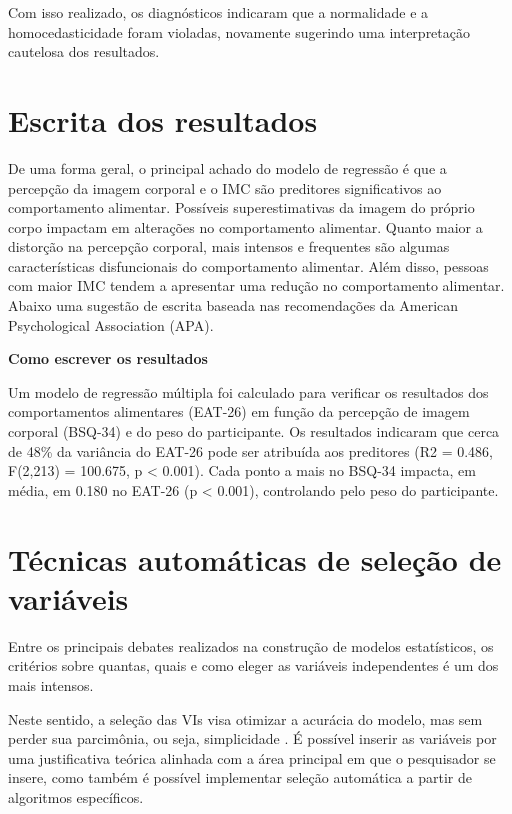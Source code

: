 \documentclass[
]{book}
\newenvironment{writing}{
  \definecolor{shadecolor}{rgb}{0, 0, 0}  %
  \color{white}
  \begin{shaded}}
 {\end{shaded}}
\begin{document}
Com isso realizado, os diagnósticos indicaram que a normalidade e a homocedasticidade foram violadas, novamente sugerindo uma interpretação cautelosa dos resultados.

\hypertarget{escrita-dos-resultados-5}{%
\section{Escrita dos resultados}\label{escrita-dos-resultados-5}}

De uma forma geral, o principal achado do modelo de regressão é que a percepção da imagem corporal e o IMC são preditores significativos ao comportamento alimentar. Possíveis superestimativas da imagem do próprio corpo impactam em alterações no comportamento alimentar. Quanto maior a distorção na percepção corporal, mais intensos e frequentes são algumas características disfuncionais do comportamento alimentar. Além disso, pessoas com maior IMC tendem a apresentar uma redução no comportamento alimentar. Abaixo uma sugestão de escrita baseada nas recomendações da American Psychological Association (APA).

\begin{writing}

\textbf{Como escrever os resultados}

Um modelo de regressão múltipla foi calculado para verificar os resultados dos comportamentos alimentares (EAT-26) em função da percepção de imagem corporal (BSQ-34) e do peso do participante. Os resultados indicaram que cerca de 48\% da variância do EAT-26 pode ser atribuída aos preditores (R2 = 0.486, F(2,213) = 100.675, p \textless{} 0.001). Cada ponto a mais no BSQ-34 impacta, em média, em 0.180 no EAT-26 (p \textless{} 0.001), controlando pelo peso do participante.

\end{writing}

\hypertarget{tuxe9cnicas-automuxe1ticas-de-seleuxe7uxe3o-de-variuxe1veis}{%
\section{Técnicas automáticas de seleção de variáveis}\label{tuxe9cnicas-automuxe1ticas-de-seleuxe7uxe3o-de-variuxe1veis}}

Entre os principais debates realizados na construção de modelos estatísticos, os critérios sobre quantas, quais e como eleger as variáveis independentes é um dos mais intensos.

Neste sentido, a seleção das VIs visa otimizar a acurácia do modelo, mas sem perder sua parcimônia, ou seja, simplicidade \citep{Unger1973, Gaudio2001}. É possível inserir as variáveis por uma justificativa teórica alinhada com a área principal em que o pesquisador se insere, como também é possível implementar seleção automática a partir de algoritmos específicos.
\end{document}
